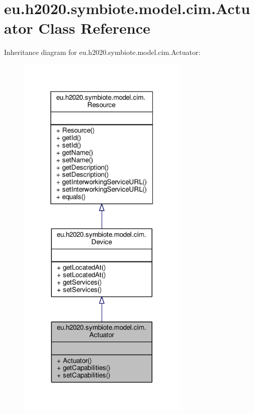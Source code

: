 \hypertarget{classeu_1_1h2020_1_1symbiote_1_1model_1_1cim_1_1Actuator}{}\section{eu.\+h2020.\+symbiote.\+model.\+cim.\+Actuator Class Reference}
\label{classeu_1_1h2020_1_1symbiote_1_1model_1_1cim_1_1Actuator}


Inheritance diagram for eu.\+h2020.\+symbiote.\+model.\+cim.\+Actuator\+:
\nopagebreak
\begin{figure}[H]
\begin{center}
\leavevmode
\includegraphics[width=232pt]{classeu_1_1h2020_1_1symbiote_1_1model_1_1cim_1_1Actuator__inherit__graph}
\end{center}
\end{figure}


